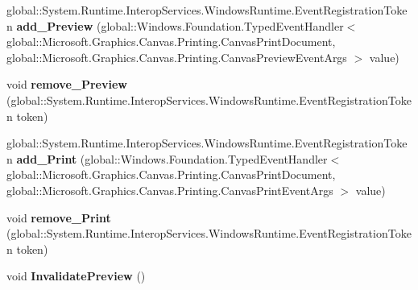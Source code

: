 \begin{DoxyCompactItemize}
global\+::\+System.\+Runtime.\+Interop\+Services.\+Windows\+Runtime.\+Event\+Registration\+Token {\bfseries add\+\_\+\+Preview} (global\+::\+Windows.\+Foundation.\+Typed\+Event\+Handler$<$ global\+::\+Microsoft.\+Graphics.\+Canvas.\+Printing.\+Canvas\+Print\+Document, global\+::\+Microsoft.\+Graphics.\+Canvas.\+Printing.\+Canvas\+Preview\+Event\+Args $>$ value)
\item 
\mbox{\label{interface_microsoft_1_1_graphics_1_1_canvas_1_1_printing_1_1_i_canvas_print_document_a86ed67a2bf892a9f75d0f01ef8fa6436}} 
void {\bfseries remove\+\_\+\+Preview} (global\+::\+System.\+Runtime.\+Interop\+Services.\+Windows\+Runtime.\+Event\+Registration\+Token token)
\item 
\mbox{\label{interface_microsoft_1_1_graphics_1_1_canvas_1_1_printing_1_1_i_canvas_print_document_a4a78f4b715e692c620d4548df21d5ac0}} 
global\+::\+System.\+Runtime.\+Interop\+Services.\+Windows\+Runtime.\+Event\+Registration\+Token {\bfseries add\+\_\+\+Print} (global\+::\+Windows.\+Foundation.\+Typed\+Event\+Handler$<$ global\+::\+Microsoft.\+Graphics.\+Canvas.\+Printing.\+Canvas\+Print\+Document, global\+::\+Microsoft.\+Graphics.\+Canvas.\+Printing.\+Canvas\+Print\+Event\+Args $>$ value)
\item 
\mbox{\label{interface_microsoft_1_1_graphics_1_1_canvas_1_1_printing_1_1_i_canvas_print_document_a6c6e9590103da951592e47820ae53fdb}} 
void {\bfseries remove\+\_\+\+Print} (global\+::\+System.\+Runtime.\+Interop\+Services.\+Windows\+Runtime.\+Event\+Registration\+Token token)
\item 
\mbox{\label{interface_microsoft_1_1_graphics_1_1_canvas_1_1_printing_1_1_i_canvas_print_document_a6624a11a39bdacc1332f7370fe4e289a}} 
void {\bfseries Invalidate\+Preview} ()
\item 
\mbox{\label{interface_microsoft_1_1_graphics_1_1_canvas_1_1_printing_1_1_i_canvas_print_document_a27ce0b5fa1108240d85779236c1ab571}} 

\end{DoxyCompactItemize}
